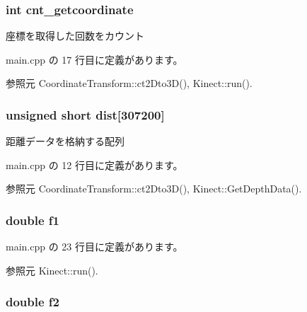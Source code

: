 \subsubsection[{cnt\-\_\-getcoordinate}]{\setlength{\rightskip}{0pt plus 5cm}int cnt\-\_\-getcoordinate}\label{_estimate_posture_8h_aaf3df6233eba9ec5d58dc12a3db8551e}


座標を取得した回数をカウント 



 main.\-cpp の 17 行目に定義があります。



参照元 Coordinate\-Transform\-::ct2\-Dto3\-D(), Kinect\-::run().

\subsubsection[{dist}]{\setlength{\rightskip}{0pt plus 5cm}unsigned short dist[307200]}\label{_estimate_posture_8h_afcfa9131bcff2392e4916bec3f2c78d1}


距離データを格納する配列 



 main.\-cpp の 12 行目に定義があります。



参照元 Coordinate\-Transform\-::ct2\-Dto3\-D(), Kinect\-::\-Get\-Depth\-Data().

\subsubsection[{f1}]{\setlength{\rightskip}{0pt plus 5cm}double f1}\label{_estimate_posture_8h_a11d54e4d4a8a4dfc36e4b5c8576a6079}


 main.\-cpp の 23 行目に定義があります。



参照元 Kinect\-::run().

\subsubsection[{f2}]{\setlength{\rightskip}{0pt plus 5cm}double f2}\label{_estimate_posture_8h_ac287bf324063285e92e9f3b9dfb8f408}


